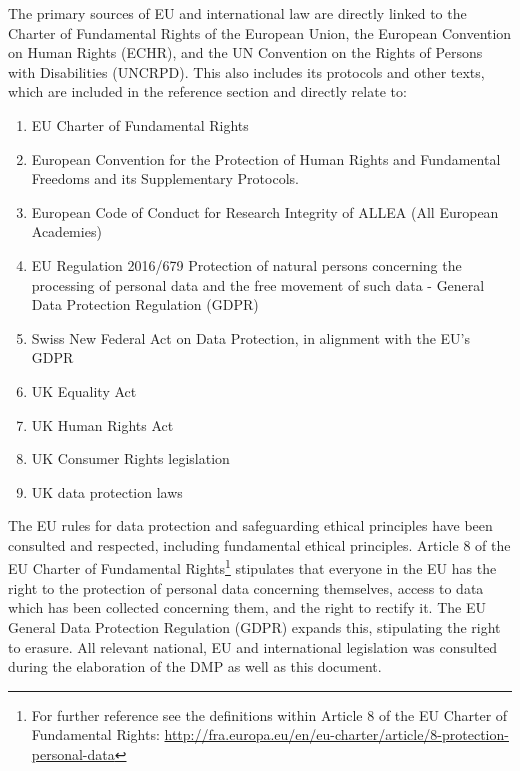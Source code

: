 \documentclass[
]{article}
\providecommand{\tightlist}{%
  \setlength{\itemsep}{0pt}\setlength{\parskip}{0pt}}
\begin{document}
The primary sources of EU and international law are directly linked to the Charter of Fundamental Rights of the European Union, the European Convention on Human Rights (ECHR), and the UN Convention on the Rights of Persons with Disabilities (UNCRPD). This also includes its protocols and other texts, which are included in the reference section and directly relate to:

\begin{enumerate}
\def\labelenumi{\arabic{enumi}.}
\tightlist
\item
  EU Charter of Fundamental Rights\\
\item
  European Convention for the Protection of Human Rights and Fundamental Freedoms and its Supplementary Protocols.\\
\item
  European Code of Conduct for Research Integrity of ALLEA (All European Academies)\\
\item
  EU Regulation 2016/679 Protection of natural persons concerning the processing of personal data and the free movement of such data - General Data Protection Regulation (GDPR)\\
\item
  Swiss New Federal Act on Data Protection, in alignment with the EU's GDPR\\
\item
  UK Equality Act\\
\item
  UK Human Rights Act\\
\item
  UK Consumer Rights legislation\\
\item
  UK data protection laws
\end{enumerate}

The EU rules for data protection and safeguarding ethical principles have been consulted and respected, including fundamental ethical principles. Article 8 of the EU Charter of Fundamental Rights\footnote{For further reference see the definitions within Article 8 of the EU Charter of Fundamental Rights: \url{http://fra.europa.eu/en/eu-charter/article/8-protection-personal-data}} stipulates that everyone in the EU has the right to the protection of personal data concerning themselves, access to data which has been collected concerning them, and the right to rectify it. The EU General Data Protection Regulation (GDPR) expands this, stipulating the right to erasure. All relevant national, EU and international legislation was consulted during the elaboration of the DMP as well as this document.
\end{document}
